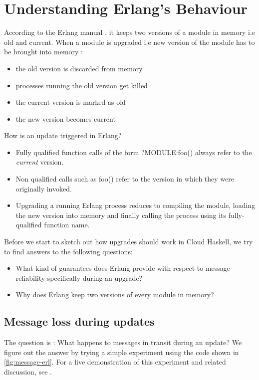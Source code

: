 \section{Understanding Erlang's Behaviour}

According to the Erlang manual \cite{_erlang_????}, it keeps two versions
of a module in memory i.e old and current. When a module is upgraded
i.e new version of the module has to be brought into memory :

\begin{itemize}
\item the old version is discarded from memory
\item processes running the old version get killed
\item the current version is marked as old
\item the new version becomes current
\end{itemize}

How is an update triggered in Erlang?

\begin{itemize}
\item Fully qualified function calls of the form ?MODULE:foo() always
  refer to the \emph{current} version.
\item Non qualified calls such as foo() refer to the version in which
  they were originally invoked.
\item Upgrading a running Erlang process reduces to compiling the
  module, loading the new version into memory and finally calling the
  process using its fully-qualified function name.
\end{itemize}

Before we start to sketch out how upgrades should work in Cloud
Haskell, we try to find answers to the following questions:

\begin{itemize}
\item What kind of guarantees does Erlang provide with respect to
  message reliability specifically during an upgrade?
\item Why does Erlang keep two versions of every module in memory?
\end{itemize}

\subsection{Message loss during updates}

The question is : What happens to messages in transit during an
update? We figure out the answer by trying a simple experiment using
the code shown in \autoref{fig:message-erl}. For a live demonstration
of this experiment and related discussion, see
\cite{more_messages_????}.

